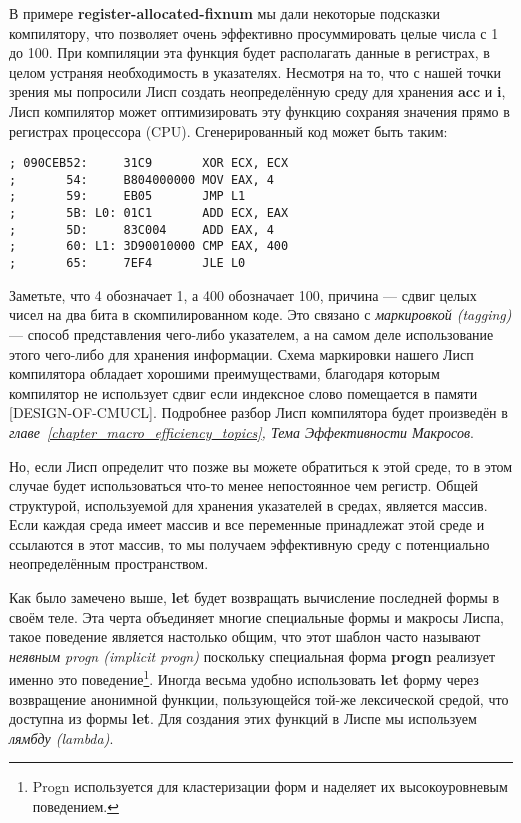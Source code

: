 В примере \textbf{register-allocated-fixnum} мы дали некоторые подсказки компилятору, что позволяет очень эффективно просуммировать целые числа с 1 до 100. При компиляции эта функция будет располагать данные в регистрах, в целом устраняя необходимость в указателях. Несмотря на то, что с нашей точки зрения мы попросили Лисп создать неопределённую среду для хранения \textbf{acc} и \textbf{i}, Лисп компилятор может оптимизировать эту функцию сохраняя значения прямо в регистрах процессора (CPU). Сгенерированный код может быть таким:

\begin{verbatim}
; 090CEB52:     31C9       XOR ECX, ECX
;       54:     B804000000 MOV EAX, 4
;       59:     EB05       JMP L1
;       5B: L0: 01C1       ADD ECX, EAX
;       5D:     83C004     ADD EAX, 4
;       60: L1: 3D90010000 CMP EAX, 400
;       65:     7EF4       JLE L0
\end{verbatim}

Заметьте, что 4 обозначает 1, а 400 обозначает 100, причина --- сдвиг целых чисел на два бита в скомпилированном коде. Это связано с \emph{маркировкой (tagging)} --- способ представления чего-либо указателем, а на самом деле использование этого чего-либо для хранения информации. Схема маркировки нашего Лисп компилятора обладает хорошими преимуществами, благодаря которым компилятор не использует сдвиг если индексное слово помещается в памяти [DESIGN-OF-CMUCL]. Подробнее разбор Лисп компилятора будет произведён в \emph{главе~\ref{chapter_macro_efficiency_topics}, Тема Эффективности Макросов}.

Но, если Лисп определит что позже вы можете обратиться к этой среде, то в этом случае будет использоваться что-то менее непостоянное чем регистр. Общей структурой, используемой для хранения указателей в средах, является массив. Если каждая среда имеет массив и все переменные принадлежат этой среде и ссылаются в этот массив, то мы получаем эффективную среду с потенциально неопределённым пространством.

Как было замечено выше, \textbf{let} будет возвращать вычисление последней формы в своём теле. Эта черта объединяет многие специальные формы и макросы Лиспа, такое поведение является настолько общим, что этот шаблон часто называют \emph{неявным progn (implicit progn)} поскольку специальная форма \textbf{progn} реализует именно это поведение\footnote{Progn используется для кластеризации форм и наделяет их высокоуровневым поведением.}. Иногда весьма удобно использовать \textbf{let} форму через возвращение анонимной функции, пользующейся той-же лексической средой, что доступна из формы \textbf{let}. Для создания этих функций в Лиспе мы используем \emph{лямбду (lambda)}.

